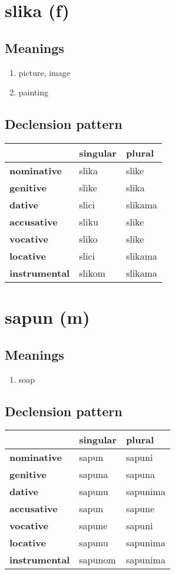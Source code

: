 \filbreak
\section{slika (f)}
\subsection*{Meanings}
\begin{enumerate}
\item picture, image
\item painting
\end{enumerate}
\subsection*{Declension pattern}
\begin{tabularx}{\linewidth}{Xll}
\toprule
{} & singular &   plural \\
\midrule
\textbf{nominative  } &    slika &    slike \\
\textbf{genitive    } &    slike &    slika \\
\textbf{dative      } &    slici &  slikama \\
\textbf{accusative  } &    sliku &    slike \\
\textbf{vocative    } &    sliko &    slike \\
\textbf{locative    } &    slici &  slikama \\
\textbf{instrumental} &   slikom &  slikama \\
\bottomrule
\end{tabularx}

\filbreak
\section{sapun (m)}
\subsection*{Meanings}
\begin{enumerate}
\item soap
\end{enumerate}
\subsection*{Declension pattern}
\begin{tabularx}{\linewidth}{Xll}
\toprule
{} & singular &    plural \\
\midrule
\textbf{nominative  } &    sapun &    sapuni \\
\textbf{genitive    } &   sapuna &    sapuna \\
\textbf{dative      } &   sapunu &  sapunima \\
\textbf{accusative  } &    sapun &    sapune \\
\textbf{vocative    } &   sapune &    sapuni \\
\textbf{locative    } &   sapunu &  sapunima \\
\textbf{instrumental} &  sapunom &  sapunima \\
\bottomrule
\end{tabularx}


